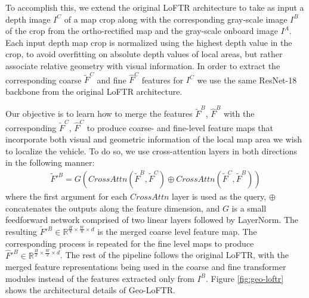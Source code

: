To accomplish this, we extend the original LoFTR architecture to take as input a depth image $I^C$ of a map crop along with the corresponding gray-scale image $I^B$ of the crop from the ortho-rectified map and the gray-scale onboard image $I^A$. Each input depth map crop is normalized using the highest depth value in the crop, to avoid overfitting on absolute depth values of local areas, but rather associate relative geometry with visual information. 
In order to extract the corresponding coarse $\tilde{F}^C$ and fine $\hat{F}^C$ features for $I^C$ we use the same ResNet-18~\cite{resnet-18} backbone from the original LoFTR architecture.

Our objective is to learn how to merge the features $\tilde{F}^B$, $\hat{F}^B$ with the corresponding $\tilde{F}^C$, $\hat{F}^C$ to produce coarse- and fine-level feature maps that incorporate both visual and geometric information of the local map area we wish to localize the vehicle.
To do so, we use cross-attention layers in both directions in the following manner:
\begin{align*}
     \tilde{F}'^B = G \left(CrossAttn(\tilde{F}^B, \tilde{F}^C) \oplus CrossAttn(\tilde{F}^C, \tilde{F}^B) \right)
\end{align*}
where the first argument for each $CrossAttn$ layer is used as the query, $\oplus$ concatenates the outputs along the feature dimension, and $G$ is a small feedforward network comprised of two linear layers followed by LayerNorm.
The resulting $\tilde{F}'^B \in \mathbb{R}^{\frac{H}{8} \times \frac{W}{8} \times d}$ is the merged coarse level feature map. The corresponding process is repeated for the fine level maps to produce $\hat{F}'^B \in \mathbb{R}^{\frac{H}{2} \times \frac{W}{2} \times d}$. The rest of the pipeline follows the original LoFTR, with the merged feature representations being used in the coarse and fine transformer modules instead of the features extracted only from $I^B$. 
Figure \ref{fig:geo-loftr} shows the architectural details of Geo-LoFTR. 




